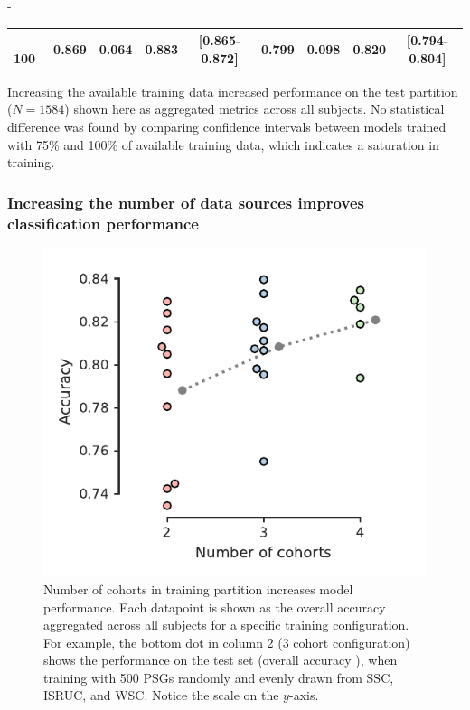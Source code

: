 \begin{table}[tb]
\begin{adjustwidth*}{}{-\marginparsep}
\begin{threeparttable}
\begin{tabular}{@{}lcccccccc@{}}
\(\quad\)100                   & 0.869         & 0.064       & 0.883           & [0.865-0.872]         & 0.799         & 0.098       & 0.820           & [0.794-0.804]         \\ \bottomrule
\end{tabular}
\begin{tablenotes}
\small \item Increasing the available training data increased performance on the test partition (\(N=1584\)) shown here as aggregated metrics across all subjects. No statistical difference was found by comparing confidence intervals between models trained with 75\% and 100\% of available training data, which indicates a saturation in training.
\end{tablenotes}
\end{threeparttable}
\end{adjustwidth*}
\end{table}

\subsubsection{Increasing the number of data sources improves classification performance}

\begin{figure}[tb]
    \centering
    \includegraphics[width=0.75\columnwidth]{figures/paper-ii/figure_05.pdf}
    \caption[\acs{MASSC}v2 number of cohorts increases performance]{Number of cohorts in training partition increases model performance. Each datapoint is shown as the overall accuracy aggregated across all subjects for a specific training configuration. For example, the bottom dot in column 2 (3 cohort configuration) shows the performance on the test set (overall accuracy ), when training with 500 PSGs randomly and evenly drawn from \ac{SSC}, \ac{ISRUC}, and \ac{WSC}. Notice the scale on the \(y\)-axis.}
    \label{fig:sleep-stages:paper-ii:figure-05}
\end{figure}

